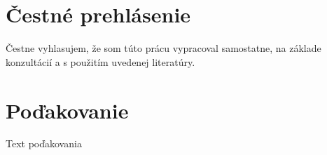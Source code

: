 \thispagestyle{empty}
\vspace*{\fill}
\section*{Čestné prehlásenie}
Čestne vyhlasujem, že som túto prácu vypracoval samostatne, na základe konzultácií
a s použitím uvedenej literatúry.

\vspace{3\medskipamount}\noindent
\SignPlace \SignDate \hspace*{\fill} \signaturespace{5cm}{\Author}
\emptypage

\thispagestyle{empty}
\vspace*{\fill}
\section*{Poďakovanie}
Text poďakovania
\emptypage